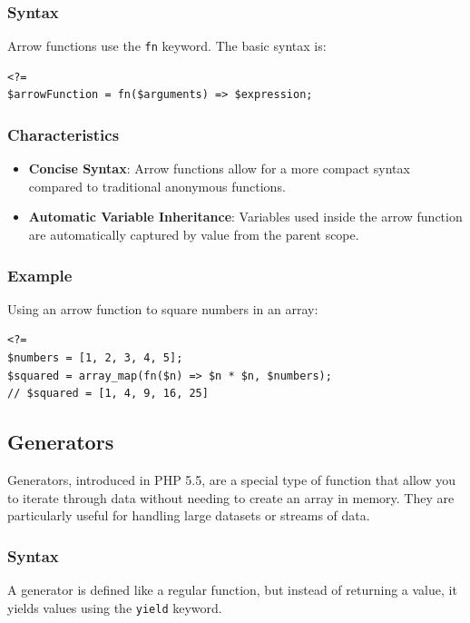 \documentclass[11pt]{article}
\begin{document}
\subsubsection{Syntax}
\label{sec:orgaa648ae}
Arrow functions use the \texttt{fn} keyword. The basic syntax is:

\begin{verbatim}
<?=
$arrowFunction = fn($arguments) => $expression;
\end{verbatim}

\subsubsection{Characteristics}
\label{sec:org2c3fe58}
\begin{itemize}
\item \textbf{Concise Syntax}: Arrow functions allow for a more compact syntax
compared to traditional anonymous functions.
\item \textbf{Automatic Variable Inheritance}: Variables used inside the arrow
function are automatically captured by value from the parent scope.
\end{itemize}

\subsubsection{Example}
\label{sec:org9f7c66b}
Using an arrow function to square numbers in an array:

\begin{verbatim}
<?=
$numbers = [1, 2, 3, 4, 5];
$squared = array_map(fn($n) => $n * $n, $numbers);
// $squared = [1, 4, 9, 16, 25]
\end{verbatim}

\subsection{Generators}
\label{sec:orgb0f8693}
Generators, introduced in PHP 5.5, are a special type of function that
allow you to iterate through data without needing to create an array in
memory. They are particularly useful for handling large datasets or
streams of data.

\subsubsection{Syntax}
\label{sec:org3723843}
A generator is defined like a regular function, but instead of returning
a value, it yields values using the \texttt{yield} keyword.
\end{document}
